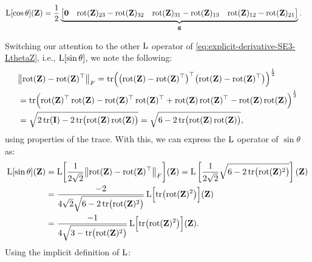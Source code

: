 \begin{align}
    \begin{split}
        \operatorname{L}[\cos\theta](\mathbf{Z}) &= \frac{1}{2}\underbrace{\begin{bmatrix}
            \mathbf{0}& \operatorname{rot}(\mathbf{Z})_{23}-\operatorname{rot}(\mathbf{Z})_{32} & \operatorname{rot}(\mathbf{Z})_{31} - \operatorname{rot}(\mathbf{Z})_{13} & \operatorname{rot}(\mathbf{Z})_{12}-\operatorname{rot}(\mathbf{Z})_{21}
        \end{bmatrix}}_{\mathbf{g}}.\label{eq:appendix-L-of-trace-OR-Lop-cos-theta-explicit}
    \end{split}
\end{align}

Switching our attention to the other $\operatorname{L}$ operator of \eqref{eq:explicit-derivative-SE3-LthetaZ}, i.e., $\operatorname{L}[\sin\theta]$, we note the following:
\begin{align}
    &\bigl\|\operatorname{rot}(\mathbf{Z}) - \operatorname{rot}(\mathbf{Z})^\top\bigr\|_F = 
    \operatorname{tr}\Bigl(\bigl(\operatorname{rot}(\mathbf{Z}) - \operatorname{rot}(\mathbf{Z})^\top\bigr)^\top\bigl(\operatorname{rot}(\mathbf{Z}) - \operatorname{rot}(\mathbf{Z})^\top\bigr)\Bigr)^{\frac{1}{2}}\\
    &= \operatorname{tr}\Bigl(\operatorname{rot}(\mathbf{Z})^\top\operatorname{rot}(\mathbf{Z})-\operatorname{rot}(\mathbf{Z})^\top\operatorname{rot}(\mathbf{Z})^\top + \operatorname{rot}(\mathbf{Z})\operatorname{rot}(\mathbf{Z})^\top - \operatorname{rot}(\mathbf{Z})\operatorname{rot}(\mathbf{Z})\Bigr)^{\frac{1}{2}}\\
    &= \sqrt{2\operatorname{tr}(\mathbf{I}) - 2\operatorname{tr}\bigl(\operatorname{rot}(\mathbf{Z})\operatorname{rot}(\mathbf{Z})\bigr)} = \sqrt{6 - 2\operatorname{tr}\bigl(\operatorname{rot}(\mathbf{Z})\operatorname{rot}(\mathbf{Z})\bigr)},
\end{align}
using properties of the trace. With this, we can express the $\operatorname{L}$ operator of $\sin\theta$ as:
\begin{align}
    \operatorname{L}[\sin\theta](\mathbf{Z}) &=\operatorname{L}\biggl[\frac{1}{2\sqrt{2}}\bigl\|\operatorname{rot}(\mathbf{Z}) - \operatorname{rot}(\mathbf{Z})^\top\bigr\|_F\biggr](\mathbf{Z}) 
    = \operatorname{L}\left[\frac{1}{2\sqrt{2}}\sqrt{6 - 2\operatorname{tr}\bigl(\operatorname{rot}(\mathbf{Z})^2\bigr)}\right](\mathbf{Z})\\
    &= \frac{-2}{4\sqrt{2}\sqrt{6 - 2\operatorname{tr}\bigl(\operatorname{rot}(\mathbf{Z})^2\bigr)}}\operatorname{L}\Bigl[\operatorname{tr}\bigl(\operatorname{rot}(\mathbf{Z})^2\bigr)\Bigr](\mathbf{Z})\\
    &= \frac{-1}{4\sqrt{3 - \operatorname{tr}\bigl(\operatorname{rot}(\mathbf{Z})^2\bigr)}}\operatorname{L}\Bigl[\operatorname{tr}\bigl(\operatorname{rot}(\mathbf{Z})^2\bigr)\Bigr](\mathbf{Z}).
\end{align}
Using the implicit definition of $\operatorname{L}$:

